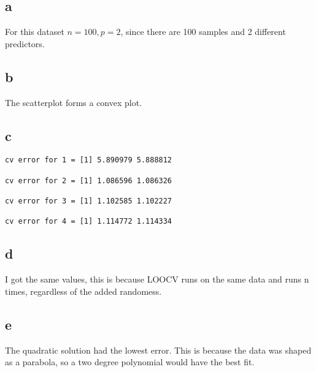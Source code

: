 \documentclass{article}
\begin{document}
\subsection*{a}
For this dataset $n = 100, p = 2$, since there are 100 samples and 2 different predictors.\\
\subsection*{b}
The scatterplot forms a convex plot.\\



\subsection*{c}
\begin{verbatim}
cv error for 1 = [1] 5.890979 5.888812

cv error for 2 = [1] 1.086596 1.086326

cv error for 3 = [1] 1.102585 1.102227

cv error for 4 = [1] 1.114772 1.114334
\end{verbatim}

\subsection*{d}
I got the same values, this is because LOOCV runs on the same data and runs n times, regardless of the added randomess.\\
\subsection*{e}
The quadratic solution had the lowest error. This is because the data was shaped as a parabola, so a two degree polynomial would have the best fit.\\
\end{document}
